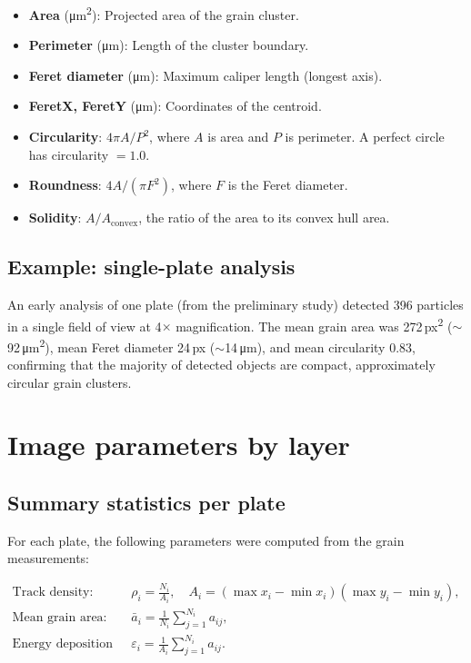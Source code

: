 \documentclass[12pt,a4paper]{article}
\begin{document}
\begin{itemize}
  \item \textbf{Area} (\si{\micro\meter\squared}): Projected area of the
        grain cluster.
  \item \textbf{Perimeter} (\si{\micro\meter}): Length of the cluster
        boundary.
  \item \textbf{Feret diameter} (\si{\micro\meter}): Maximum caliper
        length (longest axis).
  \item \textbf{FeretX, FeretY} (\si{\micro\meter}): Coordinates of the
        centroid.
  \item \textbf{Circularity}: $4\pi A/P^2$, where $A$ is area and $P$
        is perimeter. A perfect circle has circularity $= 1.0$.
  \item \textbf{Roundness}: $4A/(\pi F^2)$, where $F$ is the Feret
        diameter.
  \item \textbf{Solidity}: $A / A_{\text{convex}}$, the ratio of the
        area to its convex hull area.
\end{itemize}

\subsection{Example: single-plate analysis}

An early analysis of one plate (from the preliminary study) detected
396 particles in a single field of view at 4$\times$ magnification.
The mean grain area was 272\,px\textsuperscript{2}
($\sim$92\,\si{\micro\meter\squared}), mean Feret diameter 24\,px
($\sim$14\,\si{\micro\meter}), and mean circularity 0.83, confirming that the
majority of detected objects are compact, approximately circular grain
clusters.

\section{Image parameters by layer}
\label{sec:params}

\subsection{Summary statistics per plate}

For each plate, the following parameters were computed from the grain
measurements:

\begin{align}
\text{Track density:}\quad &
\rho_i = \frac{N_i}{A_i}, \quad
A_i = (\max x_i - \min x_i)(\max y_i - \min y_i), \label{eq:density}\\
\text{Mean grain area:}\quad &
\bar{a}_i = \frac{1}{N_i}\sum_{j=1}^{N_i} a_{ij}, \label{eq:meanarea}\\
\text{Energy deposition fraction:}\quad &
\varepsilon_i = \frac{1}{A_i}\sum_{j=1}^{N_i} a_{ij}. \label{eq:edep}
\end{align}
\end{document}
